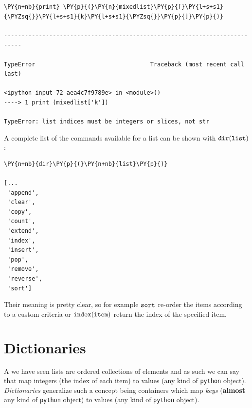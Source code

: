 \begin{codebox}[breakable, size=fbox, boxrule=1pt, pad at break*=1mm, colback=cellbackground, colframe=cellborder]
\begin{Verbatim}[commandchars=\\\{\}]
\PY{n+nb}{print} \PY{p}{(}\PY{n}{mixedlist}\PY{p}{[}\PY{l+s+s1}{\PYZsq{}}\PY{l+s+s1}{k}\PY{l+s+s1}{\PYZsq{}}\PY{p}{]}\PY{p}{)}

---------------------------------------------------------------------------

TypeError                                 Traceback (most recent call last)

<ipython-input-72-aea4c7f9789e> in <module>()
----> 1 print (mixedlist['k'])
    
TypeError: list indices must be integers or slices, not str
\end{Verbatim}
\end{codebox}

A complete list of the commands available for a list can be shown with $\tt{dir(list)}$:

\begin{codebox}[breakable, size=fbox, boxrule=1pt, pad at break*=1mm,colback=cellbackground, colframe=cellborder]
\begin{Verbatim}[commandchars=\\\{\}]
\PY{n+nb}{dir}\PY{p}{(}\PY{n+nb}{list}\PY{p}{)}

[...
 'append',
 'clear',
 'copy',
 'count',
 'extend',
 'index',
 'insert',
 'pop',
 'remove',
 'reverse',
 'sort']
\end{Verbatim}
\end{codebox}

Their meaning is pretty clear, so for example $\tt{sort}$ re-order the items according to a custom criteria or $\tt{index(item)}$ return the index of the specified item.

\section{Dictionaries}\label{dictionaries}

A we have seen lists are ordered collections of elements and as such we can say that map integers 
(the index of each item) to values (any kind of \texttt{python} object). 
\emph{Dictionaries} generalize such a concept being containers which map \emph{keys} 
(\textbf{almost} any kind of \texttt{python} object) to values (any kind of \texttt{python} object).

